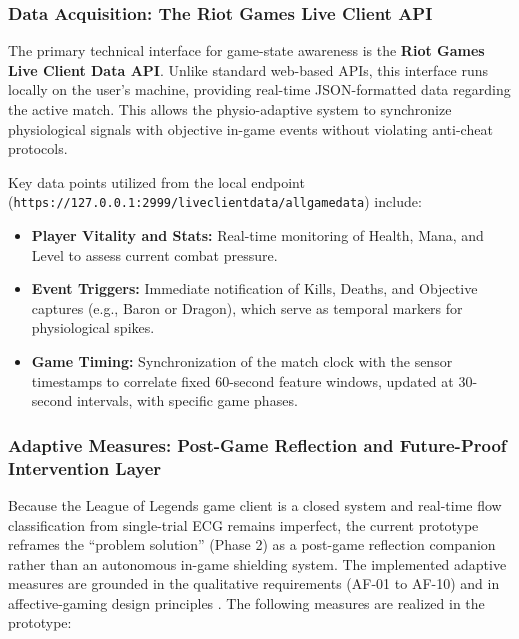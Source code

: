 \subsubsection{Data Acquisition: The Riot Games Live Client API}
The primary technical interface for game-state awareness is the \textbf{Riot Games Live Client Data API}. Unlike standard web-based APIs, this interface runs locally on the user's machine, providing real-time JSON-formatted data regarding the active match. This allows the physio-adaptive system to synchronize physiological signals with objective in-game events without violating anti-cheat protocols.

Key data points utilized from the local endpoint (\texttt{https://127.0.0.1:2999/liveclientdata/allgamedata}) include:
\begin{itemize}
    \item \textbf{Player Vitality and Stats:} Real-time monitoring of Health, Mana, and Level to assess current combat pressure.
    \item \textbf{Event Triggers:} Immediate notification of Kills, Deaths, and Objective captures (e.g., Baron or Dragon), which serve as temporal markers for physiological spikes.
    \item \textbf{Game Timing:} Synchronization of the match clock with the sensor timestamps to correlate fixed 60-second feature windows, updated at 30-second intervals, with specific game phases.
\end{itemize}

\subsubsection{Adaptive Measures: Post-Game Reflection and Future-Proof Intervention Layer}
Because the League of Legends game client is a closed system and real-time flow classification from single-trial ECG remains imperfect, the current prototype reframes the \enquote{problem solution} (Phase 2) as a post-game reflection companion rather than an autonomous in-game shielding system. The implemented adaptive measures are grounded in the qualitative requirements (AF-01 to AF-10) and in affective-gaming design principles \autocite{ubt_eref88160,9296229,irshad2023wearable}. The following measures are realized in the prototype:

